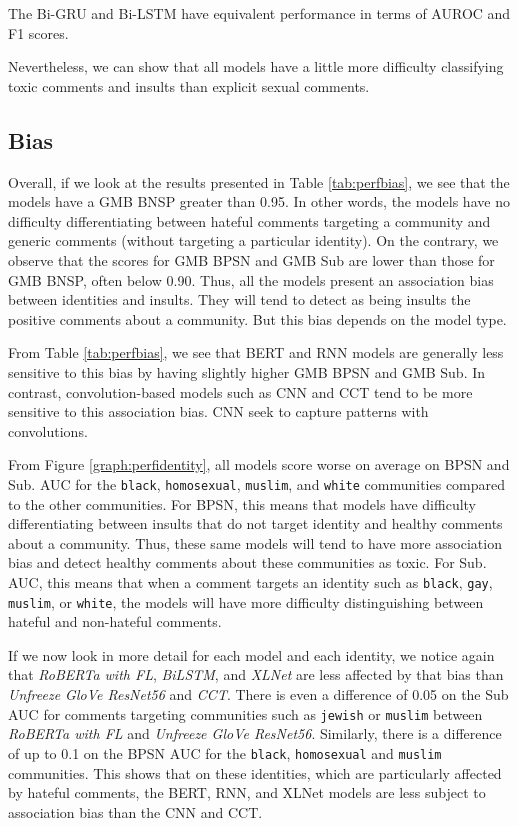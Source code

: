 \documentclass[a4paper,english]{rnti}
\begin{document}
The Bi-GRU and Bi-LSTM have equivalent performance in terms of AUROC and F1 scores.



Nevertheless, we can show that all models have a little more difficulty classifying toxic comments and insults than explicit sexual comments.

\subsection{Bias}

Overall, if we look at the results presented in Table \ref{tab:perfbias}, we see that the models have a GMB BNSP greater than 0.95. In other words, the models have no difficulty differentiating between hateful comments targeting a community and generic comments (without targeting a particular identity).
On the contrary, we observe that the scores for GMB BPSN and GMB Sub are lower than those for GMB BNSP, often below 0.90. Thus, all the models present an association bias between identities and insults. They will tend to detect as being insults the positive comments about a community. But this bias depends on the model type.

From Table \ref{tab:perfbias}, we see that BERT and RNN models are generally less sensitive to this bias by having slightly higher GMB BPSN and GMB Sub. In contrast, convolution-based models such as CNN and CCT tend to be more sensitive to this association bias. CNN seek to capture patterns with convolutions.

From Figure \ref{graph:perfidentity}, all models score worse on average on BPSN and Sub. AUC for the \texttt{black}, \texttt{homosexual}, \texttt{muslim}, and \texttt{white} communities compared to the other communities.
For BPSN, this means that models have difficulty differentiating between insults that do not target identity and healthy comments about a community. Thus, these same models will tend to have more association bias and detect healthy comments about these communities as toxic.
For Sub. AUC, this means that when a comment targets an identity such as \texttt{black}, \texttt{gay}, \texttt{muslim}, or \texttt{white}, the models will have more difficulty distinguishing between hateful and non-hateful comments.

If we now look in more detail for each model and each identity, we notice again that \textit{RoBERTa with FL}, \textit{BiLSTM}, and \textit{XLNet} are less affected by that bias than \textit{Unfreeze GloVe ResNet56} and \textit{CCT}. There is even a difference of 0.05 on the Sub AUC for comments targeting communities such as \texttt{jewish} or \texttt{muslim} between \textit{RoBERTa with FL} and \textit{Unfreeze GloVe ResNet56}. Similarly, there is a difference of up to 0.1 on the BPSN AUC for the \texttt{black}, \texttt{homosexual} and \texttt{muslim} communities.
This shows that on these identities, which are particularly affected by hateful comments, the BERT, RNN, and XLNet models are less subject to association bias than the CNN and CCT.
\end{document}
